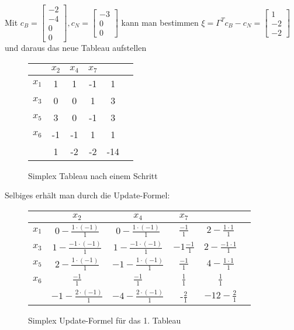 \documentclass[a4paper, 12pt]{report}
\begin{document}
Mit $c_B = \begin{bmatrix} -2\\-4\\0\\0 \end{bmatrix}, c_N = \begin{bmatrix} -3\\0\\0 \end{bmatrix} $ kann man bestimmen
$\xi = \Gamma^Tc_B - c_N = \begin{bmatrix} 1\\-2\\-2 \end{bmatrix}$ und daraus das neue Tableau aufstellen

\begin{figure}[H]
  \centering
  \def\arraystretch{1.25}
  \begin{tabular}{l|c c c|c|c}
    & $x_2$ & $x_4$ & $x_7$ & &\\
    \hline
    $x_1$ & 1 & 1 & -1 & 1 & \\
    $x_3$ & 0 & 0 & 1 & 3 & \\
    $x_5$ & 3 & 0 & -1 & 3 & \\
    $x_6$ & -1 & -1 & 1 & 1 & \\
    \hline
    & 1 & -2 & -2 & -14 &
  \end{tabular}
  \caption{Simplex Tableau nach einem Schritt}
\end{figure}

Selbiges erhält man durch die Update-Formel:

\begin{figure}[H]
  \centering
  \def\arraystretch{1.25}
  \begin{tabular}{l|c c c|c|c}
    & $x_2$ & $x_4$ & $x_7$ & &\\
    \hline
    $x_1$ & $0 - \frac{1\cdot(-1)}{1}$ & $0 - \frac{1\cdot(-1)}{1}$ & $\frac{-1}{1}$ & $2 - \frac{1\cdot 1}{1}$ & \\
    $x_3$ & $1-\frac{-1\cdot(-1)}{1}$ & $1 - \frac{-1\cdot(-1)}{1}$ & $-1\frac{-1}{1}$ & $2-\frac{-1\cdot 1}{1}$ & \\
    $x_5$ & $2 - \frac{1\cdot (-1)}{1}$ & $-1 - \frac{1\cdot(-1)}{1}$ & $\frac{-1}{1}$ & $4 - \frac{1\cdot 1}{1}$ & \\
    $x_6$ & $\frac{-1}{1}$ & $\frac{-1}{1}$ & $\frac{1}{1}$ & $\frac{1}{1}$ & \\
    \hline
    & $-1-\frac{2\cdot(-1)}{1}$ & $-4-\frac{2\cdot(-1)}{1}$ & -$\frac{2}{1}$ & $-12-\frac{2}{1}$ &
  \end{tabular}
  \caption{Simplex Update-Formel für das 1. Tableau}
\end{figure}
\end{document}
